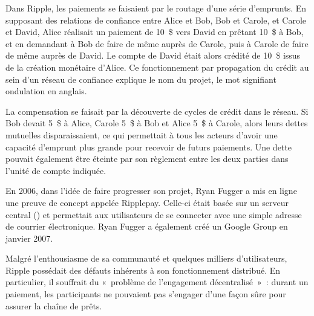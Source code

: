 Dans Ripple, les paiements se faisaient par le routage d'une série d'emprunts. En supposant des relations de confiance entre Alice et Bob, Bob et Carole, et Carole et David, Alice réalisait un paiement de 10~\$ vers David en prêtant 10~\$ à Bob, et en demandant à Bob de faire de même auprès de Carole, puis à Carole de faire de même auprès de David. Le compte de David était alors crédité de 10~\$ issus de la création monétaire d'Alice. Ce fonctionnement par propagation du crédit au sein d'un réseau de confiance explique le nom du projet, le mot  signifiant ondulation en anglais.

La compensation se faisait par la découverte de cycles de crédit dans le réseau. Si Bob devait 5~\$ à Alice, Carole 5~\$ à Bob et Alice 5~\$ à Carole, alors leurs dettes mutuelles disparaissaient, ce qui permettait à tous les acteurs d'avoir une capacité d'emprunt plus grande pour recevoir de futurs paiements. Une dette pouvait également être éteinte par son règlement entre les deux parties dans l'unité de compte indiquée.

En 2006, dans l'idée de faire progresser son projet, Ryan Fugger a mis en ligne une preuve de concept appelée Ripplepay. Celle-ci était basée sur un serveur central () et permettait aux utilisateurs de se connecter avec une simple adresse de courrier électronique. Ryan Fugger a également créé un Google Group en janvier 2007.

Malgré l'enthousiasme de sa communauté et quelques milliers d'utilisateurs, Ripple possédait des défauts inhérents à son fonctionnement distribué. En particulier, il souffrait du «~problème de l'engagement décentralisé~»~: durant un paiement, les participants ne pouvaient pas s'engager d'une façon sûre pour assurer la chaîne de prêts.

